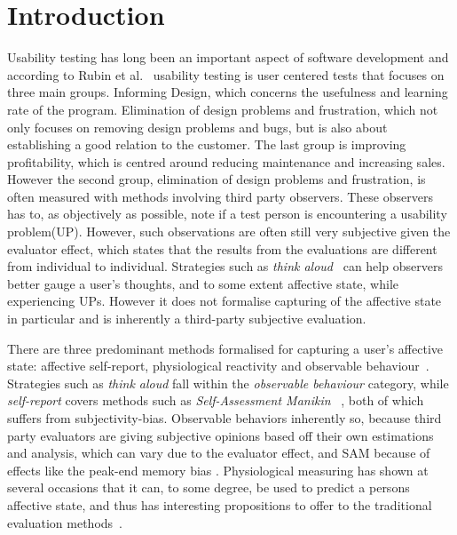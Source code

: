 
\section{Introduction}

Usability testing has long been an important aspect of software development and according to Rubin et al.~\cite{rubin2008handbook} usability testing is user centered tests that focuses on three main groups.
Informing Design, which concerns the usefulness and learning rate of the program.
Elimination of design problems and frustration, which not only focuses on removing design problems and bugs, but is also about establishing a good relation to the customer.
The last group is improving profitability, which is centred around reducing maintenance and increasing sales.
However the second group, elimination of design problems and frustration, is often measured with methods involving third party observers.
These observers has to, as objectively as possible, note if a test person is encountering a usability problem(UP).
However, such observations are often still very subjective given the evaluator effect\cite{eval_effect}, which states that the results from the evaluations are different from individual to individual.
Strategies such as \textit{think aloud}~\cite{use_of_TA_and_IDA} can help observers better gauge a user's
thoughts, and to some extent affective state, while experiencing UPs. However it does
not formalise capturing of the affective state in particular and is inherently a third-party
subjective evaluation. 

There are three predominant methods formalised for capturing a user's affective state: affective self-report, physiological reactivity and
observable behaviour~\cite{BRADLEY199449}. Strategies such as \textit{think
aloud} fall within the \textit{observable behaviour} category, while
\textit{self-report} covers methods such as \textit{Self-Assessment Manikin}
~\cite{BRADLEY199449}, both of which suffers from subjectivity-bias. 
Observable behaviors inherently so, because third party evaluators are giving subjective opinions based off their own estimations and analysis, which can vary due to the evaluator effect, and SAM because of effects like the peak-end memory bias \cite{cockburn_peakend}.
Physiological measuring has shown at several occasions that it can, to some degree, be used to predict a persons
affective state, and thus has interesting propositions to offer to the traditional evaluation methods~\cite{eeg_facial_expressions,fusion4,90_percent_eeg_emotion}.

